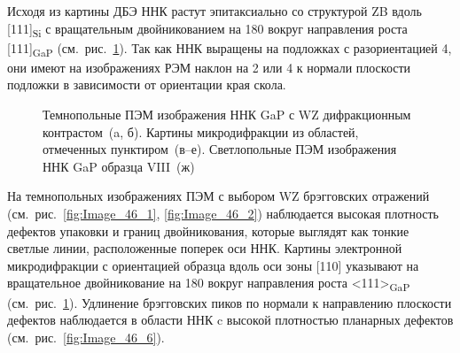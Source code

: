 Исходя из картины ДБЭ ННК растут эпитаксиально со структурой ZB вдоль [111]\textsubscript{Si} с вращательным двойникованием на 180{\textdegree} вокруг направления роста [111]\textsubscript{GaP} (см.~рис.~\cref{fig:Image_46}). Так как ННК выращены на подложках с разориентацией 4{\textdegree}, они имеют на изображениях РЭМ наклон на 2{\textdegree} или 4{\textdegree} к нормали плоскости подложки в зависимости от ориентации края скола.

\begin{figure}[ht]
	\caption{Темнопольные ПЭМ изображения ННК GaP с WZ дифракционным контрастом~(a, б). Картины микродифракции из областей, отмеченных пунктиром~(в--е). Светлопольные ПЭМ изображения ННК GaP образца VIII~(ж)}\label{fig:Image_46}
\end{figure}

На темнопольных изображениях ПЭМ с выбором WZ брэгговских отражений (см.~рис.~\cref{fig:Image_46_1}, \cref{fig:Image_46_2}) наблюдается высокая плотность дефектов упаковки и границ двойникования, которые выглядят как тонкие светлые линии, расположенные поперек оси ННК. Картины электронной микродифракции с ориентацией образца вдоль оси зоны [110] указывают на вращательное двойникование на 180{\textdegree} вокруг направления роста <111>\textsubscript{GaP} (см.~рис.~\cref{fig:Image_46}). Удлинение брэгговских пиков по нормали к направлению плоскости дефектов наблюдается в области ННК c высокой плотностью планарных дефектов (см.~рис.~\cref{fig:Image_46_6}).

